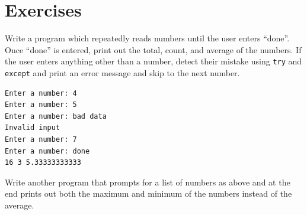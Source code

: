 \section{Exercises}

\begin{ex}
Write a program which repeatedly reads numbers until the user
enters ``done''.
Once ``done'' is entered, print out the total, count, and average
of the numbers.  If the user enters anything other than a number, 
detect their mistake using {\tt try} and {\tt except} and 
print an error message and skip to the next number.

\begin{verbatim}
Enter a number: 4
Enter a number: 5
Enter a number: bad data
Invalid input
Enter a number: 7
Enter a number: done
16 3 5.33333333333
\end{verbatim}
\end{ex}

\begin{ex}
Write another program that prompts for a list of numbers as above
and at the end prints out both the maximum and minimum of the numbers instead of the average.
\end{ex}


